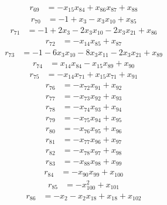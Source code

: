 \[\begin{aligned}
r_{69}&=-x_{15}x_{84}+x_{86}x_{87}+x_{88}
\end{aligned}\]
\[\begin{aligned}
r_{70}&=-1+x_{3}-x_{3}x_{10}+x_{85}
\end{aligned}\]
\[\begin{aligned}
r_{71}&=-1+2x_{3}-2x_{3}x_{10}-2x_{3}x_{21}+x_{86}
\end{aligned}\]
\[\begin{aligned}
r_{72}&=-x_{14}x_{85}+x_{87}
\end{aligned}\]
\[\begin{aligned}
r_{73}&=-1-6x_{3}x_{10}-8x_{3}x_{11}-2x_{3}x_{21}+x_{89}
\end{aligned}\]
\[\begin{aligned}
r_{74}&=x_{14}x_{84}-x_{15}x_{89}+x_{90}
\end{aligned}\]
\[\begin{aligned}
r_{75}&=-x_{14}x_{71}+x_{15}x_{71}+x_{91}
\end{aligned}\]
\[\begin{aligned}
r_{76}&=-x_{72}x_{91}+x_{92}
\end{aligned}\]
\[\begin{aligned}
r_{77}&=-x_{73}x_{92}+x_{93}
\end{aligned}\]
\[\begin{aligned}
r_{78}&=-x_{74}x_{93}+x_{94}
\end{aligned}\]
\[\begin{aligned}
r_{79}&=-x_{75}x_{94}+x_{95}
\end{aligned}\]
\[\begin{aligned}
r_{80}&=-x_{76}x_{95}+x_{96}
\end{aligned}\]
\[\begin{aligned}
r_{81}&=-x_{77}x_{96}+x_{97}
\end{aligned}\]
\[\begin{aligned}
r_{82}&=-x_{78}x_{97}+x_{98}
\end{aligned}\]
\[\begin{aligned}
r_{83}&=-x_{88}x_{98}+x_{99}
\end{aligned}\]
\[\begin{aligned}
r_{84}&=-x_{90}x_{99}+x_{100}
\end{aligned}\]
\[\begin{aligned}
r_{85}&=-x_{100}^{2}+x_{101}
\end{aligned}\]
\[\begin{aligned}
r_{86}&=-x_{2}-x_{2}x_{18}+x_{18}+x_{102}
\end{aligned}\]
